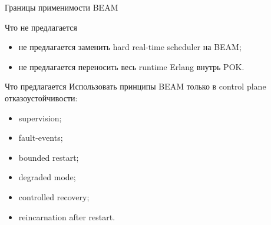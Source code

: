 \begin{frame}{Границы применимости BEAM}
	\begin{block}{Что не предлагается}
		\begin{itemize}
			\item не предлагается заменить hard real-time scheduler на BEAM;
			\item не предлагается переносить весь runtime Erlang внутрь POK.
		\end{itemize}
	\end{block}
	
	\begin{block}{Что предлагается}
		Использовать принципы BEAM только в control plane отказоустойчивости:
		\begin{itemize}
			\item supervision;
			\item fault-events;
			\item bounded restart;
			\item degraded mode;
			\item controlled recovery;
			\item reincarnation after restart.
		\end{itemize}
	\end{block}
\end{frame}